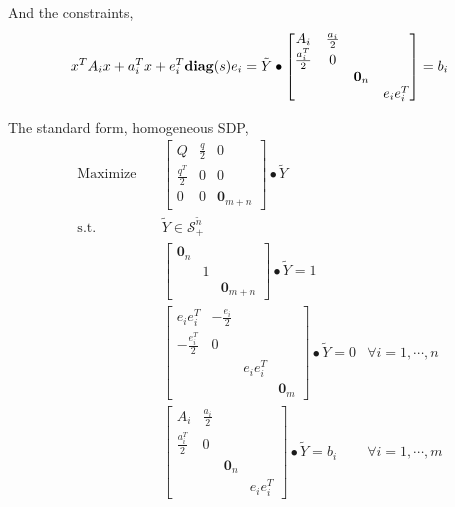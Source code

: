 \documentclass[../main]{subfiles}
\begin{document}
And the constraints,
\begin{equation}
    x^TA_ix + a_i^Tx + e_i^T\mathbf{diag}(s)e_i = \tilde{Y} \bullet    \begin{bmatrix}
        A_i             & \frac{a_i}{2} &         &          \\
        \frac{a_i^T}{2} & 0             &         &          \\
                        &               & \bm 0_n &          \\
                        &               &         & e_ie_i^T
    \end{bmatrix} = b_i
\end{equation}

The standard form, homogeneous SDP,
\begin{equation}
    \begin{aligned}
        \mathrm{Maximize}\quad & \begin{bmatrix}
            Q & \frac{q}{2} & 0 \\ \frac{q^T}{2} & 0 & 0 \\ 0 & 0 & \bm 0_{m+n}
        \end{bmatrix} \bullet \tilde Y                               \\
        \mathrm{s.t.} \quad    & \tilde{Y}  \in \mathscr S^{\tilde{n}}_+                                   \\
                               & \begin{bmatrix}  \bm 0_n &  &  \\  & 1 &  \\  & & \bm 0_{m+n} \end{bmatrix} \bullet \tilde Y = 1                           \\
                               & \begin{bmatrix}
            e_ie_i^T         & -\frac{e_i}{2} &          &         \\
            -\frac{e_i^T}{2} & 0              &          &         \\
                             &                & e_ie_i^T &         \\
                             &                &          & \bm 0_m
        \end{bmatrix} \bullet \tilde Y = 0   & \forall i=1,\cdots, n \\
                               & \begin{bmatrix}
            A_i             & \frac{a_i}{2} &         &          \\
            \frac{a_i^T}{2} & 0             &         &          \\
                            &               & \bm 0_n &          \\
                            &               &         & e_ie_i^T
        \end{bmatrix}\bullet \tilde{Y} = b_i & \forall i=1,\cdots, m \\
    \end{aligned}
\end{equation}
\end{document}

